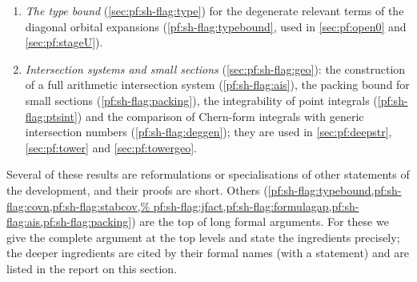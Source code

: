 \begin{enumerate}[label=(\arabic*)]
\item \emph{The type bound} (\cref{sec:pf:sh-flag:type}) for the degenerate relevant terms of the diagonal
orbital expansions (\cref{pf:sh-flag:typebound}, used in \cref{sec:pf:open0} and \cref{sec:pf:stageU}).
\item \emph{Intersection systems and small sections} (\cref{sec:pf:sh-flag:geo}): the construction of a
full arithmetic intersection system (\cref{pf:sh-flag:ais}), the packing bound for small sections
(\cref{pf:sh-flag:packing}), the integrability of point integrals (\cref{pf:sh-flag:ptsint}) and the
comparison of Chern-form integrals with generic intersection numbers (\cref{pf:sh-flag:deggen}); they are
used in \cref{sec:pf:deepstr}, \cref{sec:pf:tower} and \cref{sec:pf:towergeo}.
\end{enumerate}
Several of these results are reformulations or specialisations of other statements of the development, and
their proofs are short. Others (\cref{pf:sh-flag:typebound,pf:sh-flag:covn,pf:sh-flag:stabcov,%
pf:sh-flag:jfact,pf:sh-flag:formulagap,pf:sh-flag:ais,pf:sh-flag:packing}) are the top of long formal
arguments. For these we give the complete argument at the top levels and state the ingredients precisely;
the deeper ingredients are cited by their formal names (with a statement) and are listed in the report on
this section.


